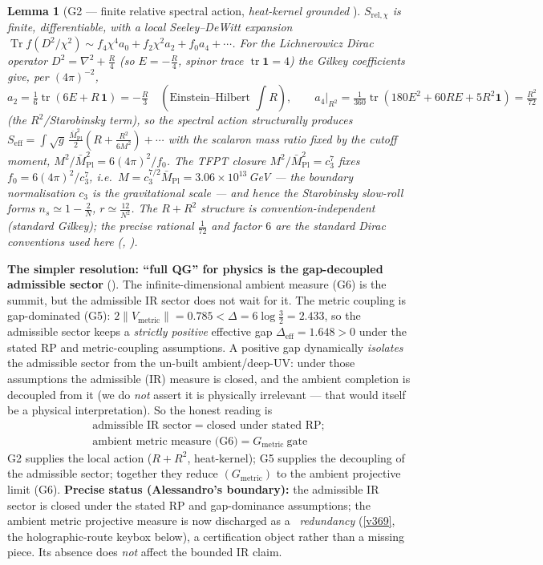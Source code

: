 \documentclass[11pt,a4paper]{article}
\newcommand{\cthree}{c_3}
\newcommand{\Mpl}{\bar M_{\mathrm{Pl}}}
\newtheorem{lemma}{Lemma}
\begin{document}
\begin{lemma}[G2 --- finite relative spectral action, \emph{heat-kernel grounded} \mE]
$S_{\mathrm{rel},\chi}$ is finite, differentiable, with a local Seeley--DeWitt expansion
$\operatorname{Tr}f(D^2/\chi^2)\sim f_4\chi^4 a_0+f_2\chi^2 a_2+f_0 a_4+\cdots$. For the Lichnerowicz
Dirac operator $D^2=\nabla^2+\tfrac R4$ (so $E=-\tfrac R4$, spinor trace $\operatorname{tr}\mathbf1=4$) the
Gilkey coefficients give, per $(4\pi)^{-2}$,
\[
  a_2=\tfrac16\operatorname{tr}(6E+R\,\mathbf1)=-\tfrac R3
  \quad(\text{Einstein--Hilbert }\textstyle\int\!R),\qquad
  a_4\big|_{R^2}=\tfrac1{360}\operatorname{tr}(180E^2{+}60RE{+}5R^2\mathbf1)=\tfrac{R^2}{72}
\]
(the $R^2$/Starobinsky term), so the spectral action \emph{structurally} produces
$S_{\mathrm{eff}}=\int\!\sqrt g\,\tfrac{\Mpl^2}{2}(R+\tfrac{R^2}{6M^2})+\cdots$ with the scalaron mass ratio
fixed by the cutoff moment, $M^2/\Mpl^2=6(4\pi)^2/f_0$. The TFPT closure $M^2/\Mpl^2=\cthree^7$ fixes
$f_0=6(4\pi)^2/\cthree^7$, i.e.\ $M=\cthree^{7/2}\Mpl=3.06\times10^{13}\,$GeV --- the boundary normalisation
$\cthree$ \emph{is} the gravitational scale --- and hence the Starobinsky slow-roll forms
$n_s\simeq1-\tfrac2N$, $r\simeq\tfrac{12}{N^2}$. The $R+R^2$ \emph{structure} is convention-independent
(standard Gilkey); the precise rational $\tfrac1{72}$ and factor $6$ are the standard Dirac conventions used
here (, ).
\end{lemma}

\par\smallskip\noindent\textbf{The simpler resolution: ``full QG'' for physics is the gap-decoupled admissible sector} (\mE).
The infinite-dimensional ambient measure (G6) is the summit, but the admissible IR sector does not wait for
it. The metric coupling is gap-dominated (G5): $2\|V_{\mathrm{metric}}\|=0.785<\Delta=6\log\tfrac32=2.433$,
so the admissible sector keeps a \emph{strictly positive} effective gap $\Delta_{\mathrm{eff}}=1.648>0$
under the stated RP and metric-coupling assumptions. A positive gap dynamically \emph{isolates} the
admissible sector from the un-built ambient/deep-UV: under those assumptions the admissible (IR) measure is
closed, and the ambient completion is decoupled from it (we do \emph{not} assert it is physically
irrelevant --- that would itself be a physical interpretation). So the honest reading is
\[
  \boxed{\ \begin{gathered}
  \text{admissible IR sector}=\text{closed under stated RP};\\[2pt]
  \text{ambient metric measure (G6)}=G_{\mathrm{metric}}\ \text{gate}
  \end{gathered}\ }
\]
G2 supplies the local action ($R+R^2$, heat-kernel); G5 supplies the decoupling of the admissible sector;
together they reduce $(G_{\mathrm{metric}})$ to the ambient projective limit (G6). \textbf{Precise status
(Alessandro's boundary):} the admissible IR sector is closed under the stated RP and gap-dominance
assumptions; the ambient metric projective measure is now discharged as a \mC\ \emph{redundancy} (\vref{v369},
the holographic-route keybox below), a certification object rather than a missing piece. Its
absence does \emph{not} affect the bounded IR claim. 
\end{document}
